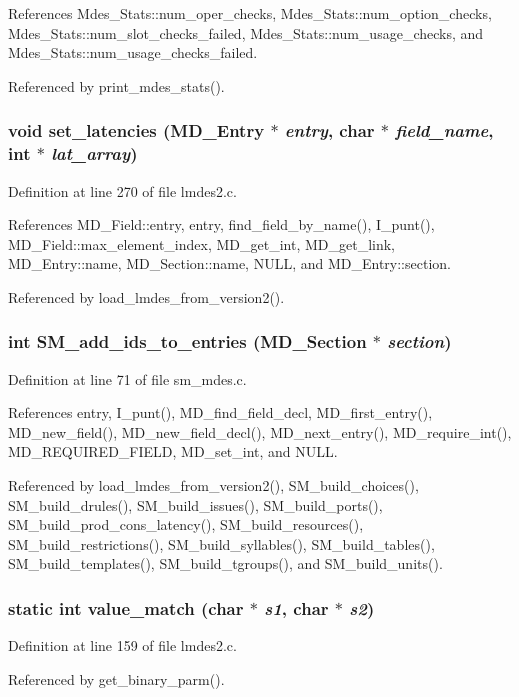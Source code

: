 References Mdes\_\-Stats::num\_\-oper\_\-checks, Mdes\_\-Stats::num\_\-option\_\-checks, Mdes\_\-Stats::num\_\-slot\_\-checks\_\-failed, Mdes\_\-Stats::num\_\-usage\_\-checks, and Mdes\_\-Stats::num\_\-usage\_\-checks\_\-failed.

Referenced by print\_\-mdes\_\-stats().
\subsubsection{\setlength{\rightskip}{0pt plus 5cm}void set\_\-latencies (\bf{MD\_\-Entry} $\ast$ {\em entry}, char $\ast$ {\em field\_\-name}, int $\ast$ {\em lat\_\-array})}\label{lmdes2_8c_53965a6fe6b1113e05485fde7c10d391}




Definition at line 270 of file lmdes2.c.

References MD\_\-Field::entry, entry, find\_\-field\_\-by\_\-name(), I\_\-punt(), MD\_\-Field::max\_\-element\_\-index, MD\_\-get\_\-int, MD\_\-get\_\-link, MD\_\-Entry::name, MD\_\-Section::name, NULL, and MD\_\-Entry::section.

Referenced by load\_\-lmdes\_\-from\_\-version2().
\subsubsection{\setlength{\rightskip}{0pt plus 5cm}int SM\_\-add\_\-ids\_\-to\_\-entries (\bf{MD\_\-Section} $\ast$ {\em section})}\label{lmdes2_8c_4d1665aeb658c58e66a84443a500d2c2}




Definition at line 71 of file sm\_\-mdes.c.

References entry, I\_\-punt(), MD\_\-find\_\-field\_\-decl, MD\_\-first\_\-entry(), MD\_\-new\_\-field(), MD\_\-new\_\-field\_\-decl(), MD\_\-next\_\-entry(), MD\_\-require\_\-int(), MD\_\-REQUIRED\_\-FIELD, MD\_\-set\_\-int, and NULL.

Referenced by load\_\-lmdes\_\-from\_\-version2(), SM\_\-build\_\-choices(), SM\_\-build\_\-drules(), SM\_\-build\_\-issues(), SM\_\-build\_\-ports(), SM\_\-build\_\-prod\_\-cons\_\-latency(), SM\_\-build\_\-resources(), SM\_\-build\_\-restrictions(), SM\_\-build\_\-syllables(), SM\_\-build\_\-tables(), SM\_\-build\_\-templates(), SM\_\-build\_\-tgroups(), and SM\_\-build\_\-units().
\subsubsection{\setlength{\rightskip}{0pt plus 5cm}static int value\_\-match (char $\ast$ {\em s1}, char $\ast$ {\em s2})\hspace{0.3cm}{\tt  [static]}}\label{lmdes2_8c_fc22e1d6a3d854cec8597ccbfa14d6ca}




Definition at line 159 of file lmdes2.c.

Referenced by get\_\-binary\_\-parm().